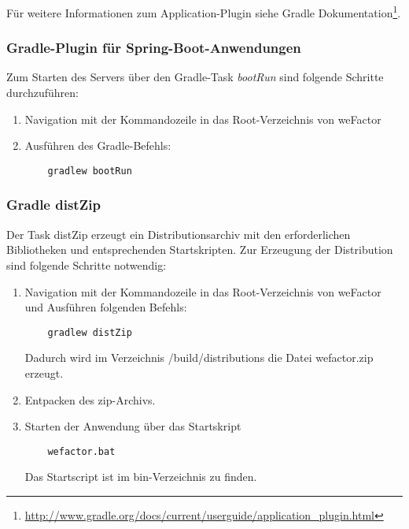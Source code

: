 Für weitere Informationen zum Application-Plugin siehe
Gradle Dokumentation\footnote{\url{http://www.gradle.org/docs/current/userguide/application_plugin.html}}.

\subsubsection{Gradle-Plugin für Spring-Boot-Anwendungen}
Zum Starten des Servers über den Gradle-Task \emph{bootRun} sind folgende Schritte durchzuführen:
   \begin{enumerate}

    \item Navigation mit der Kommandozeile in das Root-Verzeichnis von weFactor
    \item Ausführen des Gradle-Befehls:
    \begin{lstlisting}
    gradlew bootRun
    \end{lstlisting}

   \end{enumerate}

\subsubsection{Gradle distZip}
Der Task distZip erzeugt ein Distributionsarchiv mit den erforderlichen Bibliotheken und entsprechenden Startskripten. Zur Erzeugung der Distribution sind folgende Schritte notwendig:

   \begin{enumerate}

    \item Navigation mit der Kommandozeile in das Root-Verzeichnis von weFactor und Ausführen folgenden Befehls:
    \begin{lstlisting}
    gradlew distZip
    \end{lstlisting}
    Dadurch wird im Verzeichnis /build/distributions die Datei wefactor.zip erzeugt.
    \item Entpacken des zip-Archivs.
    \item Starten der Anwendung über das Startskript
    \begin{lstlisting}
    wefactor.bat
    \end{lstlisting}
    Das Startscript ist im bin-Verzeichnis zu finden.
        

   \end{enumerate}



